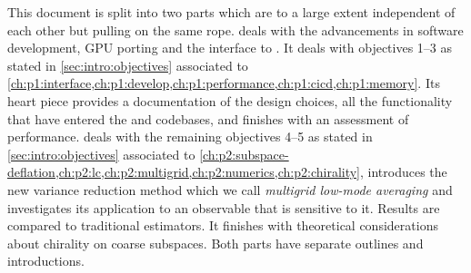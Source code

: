 This document is split into two parts which are to a large extent independent of each other but pulling on the same rope.
 deals with the advancements in software development, GPU porting and the interface to \quda.
It deals with objectives \numrange{1}{3} as stated in \cref{sec:intro:objectives} associated to \cref{ch:p1:interface,ch:p1:develop,ch:p1:performance,ch:p1:cicd,ch:p1:memory}.
Its heart piece provides a documentation of the design choices, all the functionality that have entered the \openqxd and \quda codebases, and finishes with an assessment of performance.
 deals with the remaining objectives \numrange{4}{5} as stated in \cref{sec:intro:objectives} associated to \cref{ch:p2:subspace-deflation,ch:p2:lc,ch:p2:multigrid,ch:p2:numerics,ch:p2:chirality}, introduces the new variance reduction method which we call \emph{multigrid low-mode averaging} and investigates its application to an observable that is sensitive to it.
Results are compared to traditional estimators.
It finishes with theoretical considerations about chirality on coarse subspaces.
Both parts have separate outlines and introductions.
